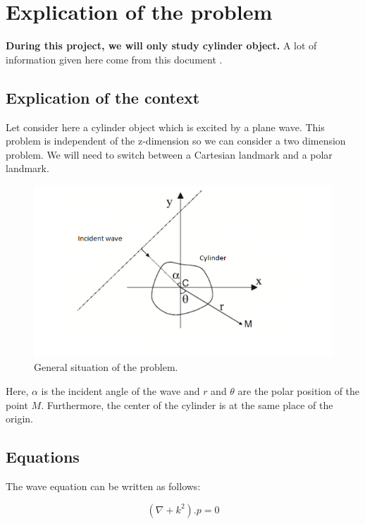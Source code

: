 \chapter{Explication of the problem}

\medskip
\textbf{During this project, we will only study cylinder object.}
A lot of information given here come from this document \cite{EDP}.

\section{Explication of the context}

Let consider here a cylinder object which is excited by a plane wave. This problem is independent of the z-dimension so we can consider a two dimension problem.
We will need to switch between a Cartesian landmark and a polar landmark.
\begin{figure}[H]
\centering
    \includegraphics[scale=1,angle=0]{Images/Image2.PNG}
    \caption{General situation of the problem.}
    \label{fig:Image2}
\end{figure}

Here, $\alpha$ is the incident angle of the wave and $r$ and $\theta$ are the polar position of the point $M$. Furthermore, the center of the cylinder is at the same place of the origin. 

\section{Equations}


The wave equation can be written as follows:

\begin{equation}
 (\nabla + k^2).p = 0 
\end{equation}

